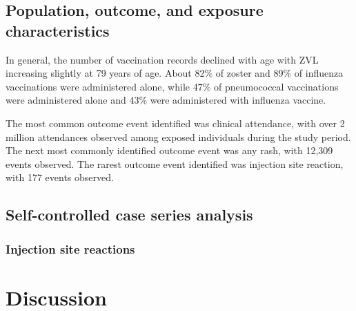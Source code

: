 \documentclass[review, endfloat]{elsarticle}
\begin{document}
\subsection{Population, outcome, and exposure characteristics}

In general, the number of vaccination records declined with age with ZVL increasing slightly at 79 years of age. About 82\% of zoster and 89\% of influenza vaccinations were administered alone, while 47\% of pneumococcal vaccinations were administered alone and 43\% were administered with influenza vaccine.

The most common outcome event identified was clinical attendance, with over 2 million attendances observed among exposed individuals during the study period. The next most commonly identified outcome event was any rash, with 12,309 events observed. The rarest outcome event identified was injection site reaction, with 177 events observed.

\subsection{Self-controlled case series analysis}

\subsubsection{Injection site reactions}

\section{Discussion}



\end{document}
